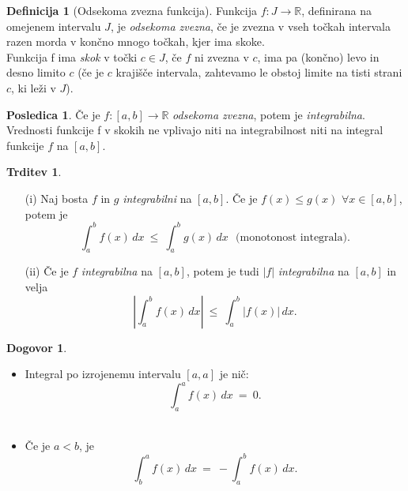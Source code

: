 \documentclass[11pt]{article}
\theoremstyle{definition}
\newtheorem{definicija}{Definicija}[section]
\theoremstyle{definition}
\newtheorem{trditev}{Trditev}[section]
\theoremstyle{definition}
\theoremstyle{theorem}
\newtheorem*{posledica}{Posledica}
\newtheorem*{dogovor}{Dogovor}
\begin{document}
\begin{definicija}[Odsekoma zvezna funkcija]

Funkcija $f: J \rightarrow \mathbb{R}$, definirana na omejenem intervalu $J$, je \textit{odsekoma zvezna}, če je zvezna v vseh točkah intervala razen morda v končno mnogo točkah, kjer ima skoke. \\

\noindent Funkcija f ima \textit{skok} v točki $c \in J$, če $f$ ni zvezna v $c$, ima pa (končno) levo in desno limito $c$ (če je $c$ krajišče intervala, zahtevamo le obstoj limite na tisti strani $c$, ki leži v $J$). 

\end{definicija}
\vspace{0.5cm}

\begin{posledica}

Če je $f:[a, b] \rightarrow \mathbb{R}$ \textit{odsekoma zvezna}, potem je \textit{integrabilna}. Vrednosti funkcije f v skokih ne vplivajo niti na integrabilnost niti na integral funkcije $f$ na $[a, b]$.

\end{posledica}
\vspace{0.5cm}

\begin{trditev}
~
\begin{enumerate}
	
	\item[(i)] Naj bosta $f$ in $g$ \textit{integrabilni} na $[a, b]$. Če je $f(x) \leq g(x)$ $\forall x \in [a, b]$, potem je 
	$$\int_a^b f(x)\,dx ~\leq~ \int_a^b g(x)\,dx ~~~\text{(monotonost integrala)}.$$
	
	\item[(ii)] Če je $f$ \textit{integrabilna} na $[a, b]$, potem je tudi $|f|$ \textit{integrabilna} na $[a, b]$ in velja
	$$\left| \int_a^b f(x)\,dx \right| ~\leq~ \int_a^b |f(x)|\,dx.$$	
	
\end{enumerate}
\end{trditev}
\vspace{0.5cm}

\begin{dogovor}
~
	\begin{itemize}
		\item Integral po izrojenemu intervalu $[a, a]$ je nič: 
		$$\int_{a}^{a} f(x)\,dx ~=~ 0.$$ \\
		\item Če je $a < b$, je 
		$$\int_{b}^{a} f(x)\,dx ~=~ -\int_{a}^{b} f(x)\,dx.$$
	\end{itemize}
\end{dogovor}
\vspace{0.5cm}
\end{document}
